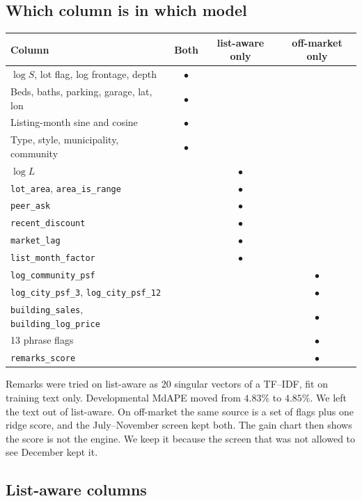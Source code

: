 \documentclass[11pt]{article}
\newcommand{\la}{list-aware}
\newcommand{\om}{off-market}
\begin{document}
\subsection{Which column is in which model}

\begin{center}
\small
\begin{tabular}{p{4.6cm}ccc}
\toprule
Column & Both & \la{} only & \om{} only \\
\midrule
\(\log S\), lot flag, log frontage, depth & \(\bullet\) & & \\
Beds, baths, parking, garage, lat, lon & \(\bullet\) & & \\
Listing-month sine and cosine & \(\bullet\) & & \\
Type, style, municipality, community & \(\bullet\) & & \\
\(\log L\) & & \(\bullet\) & \\
\texttt{lot\_area}, \texttt{area\_is\_range} & & \(\bullet\) & \\
\texttt{peer\_ask} & & \(\bullet\) & \\
\texttt{recent\_discount} & & \(\bullet\) & \\
\texttt{market\_lag} & & \(\bullet\) & \\
\texttt{list\_month\_factor} & & \(\bullet\) & \\
\texttt{log\_community\_psf} & & & \(\bullet\) \\
\texttt{log\_city\_psf\_3}, \texttt{log\_city\_psf\_12} & & & \(\bullet\) \\
\texttt{building\_sales}, \texttt{building\_log\_price} & & & \(\bullet\) \\
13 phrase flags & & & \(\bullet\) \\
\texttt{remarks\_score} & & & \(\bullet\) \\
\bottomrule
\end{tabular}
\end{center}

Remarks were tried on \la{} as 20 singular vectors of a TF--IDF, fit on training text only. Developmental MdAPE moved from \(4.83\%\) to \(4.85\%\). We left the text out of \la. On \om{} the same source is a set of flags plus one ridge score, and the July--November screen kept both. The gain chart then shows the score is not the engine. We keep it because the screen that was not allowed to see December kept it.

\subsection{List-aware columns}
\end{document}
